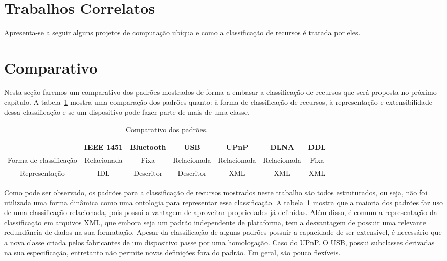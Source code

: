 \section{Trabalhos Correlatos}
Apresenta-se a seguir alguns projetos de computação ubíqua e como a classificação de recursos é tratada por eles.






\section{Comparativo}
Nesta seção faremos um comparativo dos padrões mostrados de forma a embasar a classificação de recursos que será proposta no próximo capítulo. A tabela~\ref{tab:comparativo} mostra uma comparação dos padrões quanto: à forma de classificação de recursos, à representação e extensibilidade dessa classificação e se um dispositivo pode fazer parte de mais de uma classe.

\begin{table}
	\caption{Comparativo dos padrões.}
	\begin{center}
	\resizebox{16cm}{!} {
		\begin{tabular}{ccccccc}
		\hline
							& \textbf{IEEE 1451}	& \textbf{Bluetooth} 	& \textbf{USB}	& \textbf{UPnP} & \textbf{DLNA} & \textbf{DDL}\\
		\hline
		Forma de classificação 		& Relacionada 			& Fixa 					& Relacionada 	& Relacionada 	& Relacionada 	& Fixa \\
		\hline
		Representação 		& IDL 					& Descritor				& Descritor		& XML			& XML 			& XML \\ 
		\hline
		\end{tabular}
	}
	\end{center}
	\label{tab:comparativo}
\end{table}
 
Como pode ser observado, os padrões para a classificação de recursos mostrados neste trabalho são todos estruturados, ou seja, não foi utilizada uma forma dinâmica como uma ontologia para representar essa classificação. A tabela~\ref{tab:comparativo} mostra que a maioria dos padrões faz uso de uma classificação relacionada, pois possui a vantagem de aproveitar propriedades já definidas. Além disso, é comum a representação da classificação em arquivos XML, que embora seja um padrão independente de plataforma, tem a desvantagem de possuir uma relevante redundância de dados na sua formatação. Apesar da classificação de alguns padrões possuir a capacidade de ser extensível, é necessário que a nova classe criada pelos fabricantes de um dispositivo passe por uma homologação. Caso do UPnP. O USB, possui subclasses derivadas na sua especificação, entretanto não permite novas definições fora do padrão. Em geral, são pouco flexíveis. 

